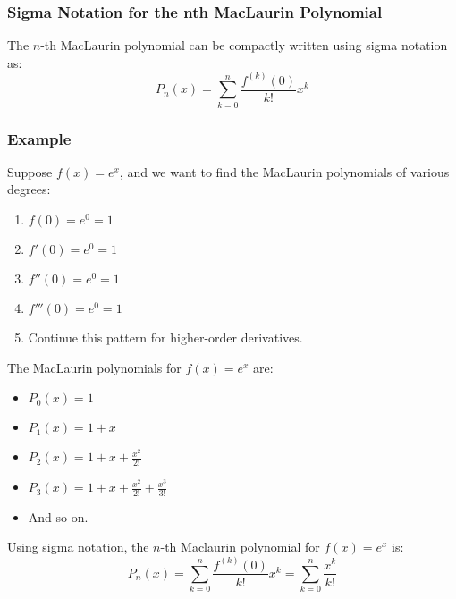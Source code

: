 \documentclass{article}
\begin{document}
\subsubsection*{Sigma Notation for the nth MacLaurin Polynomial}
The \( n \)-th MacLaurin polynomial can be compactly written using sigma notation as:
\[ P_n(x) = \sum_{k=0}^{n} \frac{f^{(k)}(0)}{k!} x^k \]

\subsubsection*{Example}
Suppose \( f(x) = e^x \), and we want to find the MacLaurin polynomials of various degrees:
\begin{enumerate}
\item \( f(0) = e^0 = 1 \)
\item \( f'(0) = e^0 = 1 \)
\item \( f''(0) = e^0 = 1 \)
\item \( f'''(0) = e^0 = 1 \)
\item Continue this pattern for higher-order derivatives.
\end{enumerate}

The MacLaurin polynomials for \( f(x) = e^x \) are:
\begin{itemize}
\item \( P_0(x) = 1 \)
\item \( P_1(x) = 1 + x \)
\item \( P_2(x) = 1 + x + \frac{x^2}{2!} \)
\item \( P_3(x) = 1 + x + \frac{x^2}{2!} + \frac{x^3}{3!} \)
\item And so on.
\end{itemize}

Using sigma notation, the \( n \)-th Maclaurin polynomial for \( f(x) = e^x \) is:
\[ P_n(x) = \sum_{k=0}^{n} \frac{f^{(k)}(0)}{k!} x^k = \sum_{k=0}^{n} \frac{x^k}{k!} \]

\begin{center}
\end{center}
\end{document}
